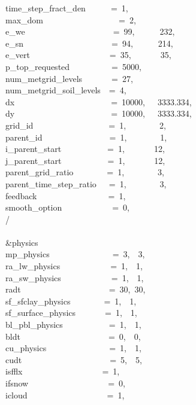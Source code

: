 time\_step\_fract\_den~~~~~~=~1,\\
max\_dom~~~~~~~~~~~~~~~~~~=~2,\\
e\_we~~~~~~~~~~~~~~~~~~~~~=~99,~~~~~~232,~\\
e\_sn~~~~~~~~~~~~~~~~~~~~~=~94,~~~~~~214,~\\
e\_vert~~~~~~~~~~~~~~~~~~~=~35,~~~~~~~35,~\\
p\_top\_requested~~~~~~~~~~=~5000,\\
num\_metgrid\_levels~~~~~~~=~27,\\
num\_metgrid\_soil\_levels~~=~4,\\
dx~~~~~~~~~~~~~~~~~~~~~~~=~10000,~~~3333.334,~\\
dy~~~~~~~~~~~~~~~~~~~~~~~=~10000,~~~3333.334,~\\
grid\_id~~~~~~~~~~~~~~~~~~=~1,~~~~~~~~2,~~\\
parent\_id~~~~~~~~~~~~~~~~=~1,~~~~~~~~1,~~\\
i\_parent\_start~~~~~~~~~~~=~1,~~~~~~~12,~~\\
j\_parent\_start~~~~~~~~~~~=~1,~~~~~~~12,~~\\
parent\_grid\_ratio~~~~~~~~=~1,~~~~~~~~3,~~\\
parent\_time\_step\_ratio~~~=~1,~~~~~~~~3,~~\\
feedback~~~~~~~~~~~~~~~~~=~1,\\
smooth\_option~~~~~~~~~~~~=~0,\\
/\\
\\
\&physics~~~~~~~~~~~~~~~~~\\
mp\_physics~~~~~~~~~~~~~~~=~3,~~3,~\\
ra\_lw\_physics~~~~~~~~~~~~=~1,~~1,~\\
ra\_sw\_physics~~~~~~~~~~~~=~1,~~1,~\\
radt~~~~~~~~~~~~~~~~~~~~~=~30,~30,\\
sf\_sfclay\_physics~~~~~~~~=~1,~~1,~\\
sf\_surface\_physics~~~~~~~=~1,~~1,~\\
bl\_pbl\_physics~~~~~~~~~~~=~1,~~1,~\\
bldt~~~~~~~~~~~~~~~~~~~~~=~0,~~0,~\\
cu\_physics~~~~~~~~~~~~~~~=~1,~~1,~\\
cudt~~~~~~~~~~~~~~~~~~~~~=~5,~~5,~\\
isfflx~~~~~~~~~~~~~~~~~~~=~1,\\
ifsnow~~~~~~~~~~~~~~~~~~~=~0,\\
icloud~~~~~~~~~~~~~~~~~~~=~1,\\
